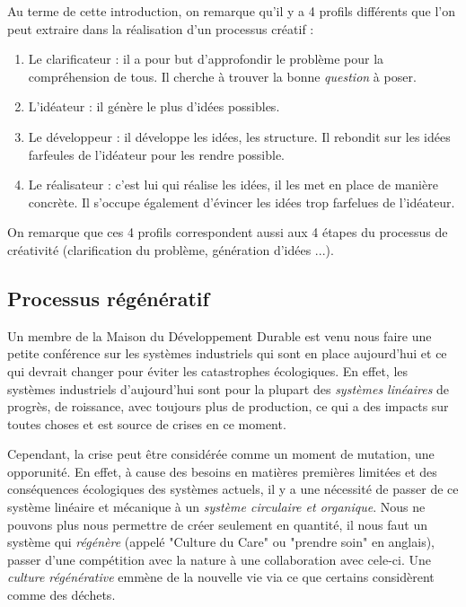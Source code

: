 Au terme de cette introduction, on remarque qu'il y a 4 profils différents que l'on peut
extraire dans la réalisation d'un processus créatif :

\begin{enumerate}
	\item Le clarificateur : il a pour but d'approfondir le problème pour la compréhension de tous.
	Il cherche à trouver la bonne \textit{question} à poser.
	\item L'idéateur : il génère le plus d'idées possibles.
	\item Le développeur : il développe les idées, les structure. Il rebondit sur les idées farfeules
	de l'idéateur pour les rendre possible.
	\item Le réalisateur : c'est lui qui réalise les idées, il les met en place de manière concrète.
	Il s'occupe également d'évincer les idées trop farfelues de l'idéateur.
\end{enumerate}

On remarque que ces 4 profils correspondent aussi aux 4 étapes du processus de créativité
(clarification du problème, génération d'idées ...).

\subsection{Processus régénératif}
Un membre de la Maison du Développement Durable est venu nous faire une petite conférence sur
les systèmes industriels qui sont en place aujourd'hui et ce qui devrait changer pour éviter
les catastrophes écologiques. En effet, les systèmes industriels d'aujourd'hui sont pour la plupart
des \textit{systèmes linéaires} de progrès, de roissance, avec toujours plus de production,
ce qui a des impacts sur toutes choses et est source de crises en ce moment.

Cependant, la crise peut être considérée comme un moment de mutation, une opporunité.
En effet, à cause des besoins en matières premières limitées et des conséquences écologiques
des systèmes actuels, il y a une nécessité de passer de ce système linéaire et mécanique à
un \textit{système circulaire et organique}. Nous ne pouvons plus nous permettre de créer
seulement en quantité, il nous faut un système qui \textit{régénère} (appelé "Culture du Care"
ou "prendre soin" en anglais), passer d'une compétition avec la nature à une collaboration avec cele-ci.
Une \textit{culture régénérative} emmène de la nouvelle vie via ce que certains considèrent comme des déchets.

